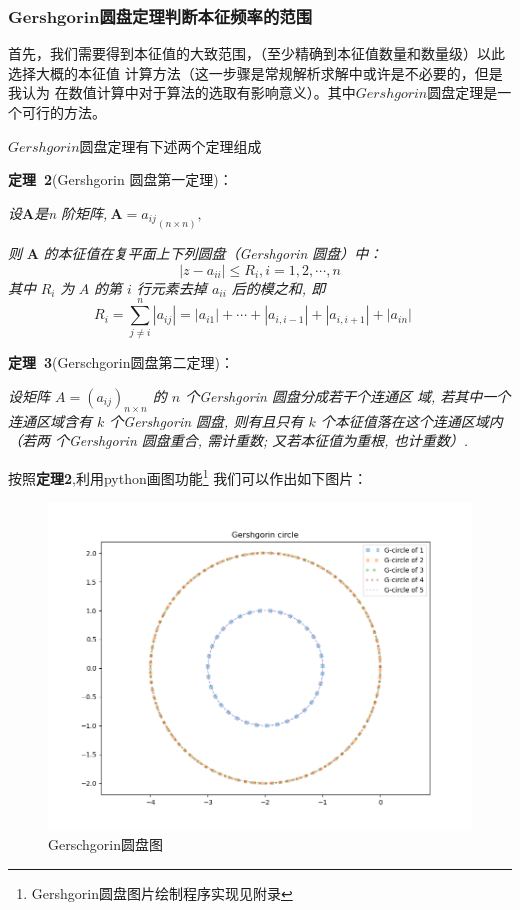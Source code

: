 \documentclass[11pt, a4paper, oneside]{ctexart}
\begin{document}
{\subsubsection{$\mathbf {Gershgorin}$圆盘定理判断本征频率的范围}
{
    首先，我们需要得到本征值的大致范围，（至少精确到本征值数量和数量级）以此选择大概的本征值
    计算方法（这一步骤是常规解析求解中或许是不必要的，但是我认为
    在数值计算中对于算法的选取有影响意义）。其中$ {Gershgorin}$圆盘定理是一个可行的方法。
    
    $ {Gershgorin}${圆盘定理}有下述两个定理组成
    \vspace{2mm}

    \textbf{定理\ 2}(Gershgorin
    圆盘第一定理)：
    
    \emph{设}$\boldsymbol {A}$\emph{是n
    阶矩阵,}$\ \boldsymbol A={a_{ij}}_{(n \times n)},\ ${\emph 则
    $\boldsymbol A$   \emph{的本征值在复平面上下列圆盘（Gershgorin 圆盘）中：
    }
    $$
    \left|z-a_{i i}\right| \leq R_{i}, i=1,2, \cdots, n
    $$
    \emph{其中} $R_{i}$ \emph 为 $A$ \emph{的第{} $i$
    行元素去掉 $a_{i i}$ 后的模之和, 即
    $$R_{i}=\sum_{j \neq i}^{n}\left|a_{i j}\right|=\left|a_{i 1}\right|+\cdots+\left|a_{i, i-1}\right|+\left|a_{i, i+1}\right|+\left|a_{i n}\right| \quad$$ 
    }
    \vspace{-6mm}

    \textbf{定理\ 3}(Gerschgorin圆盘第二定理)：
    
    \emph{设矩阵 $A=\left(a_{i j}\right)_{n \times n}$ 的 $n$ 个Gershgorin
    圆盘分成若干个连通区 域, 若其中一个连通区域含有 $k$ 个Gershgorin
    圆盘, 则有且只有 $k$ 个本征值落在这个连通区域内（若两 个Gershgorin
    圆盘重合, 需计重数; 又若本征值为重根, 也计重数）.
    }

    
    按照\textbf{定理2},利用python画图功能\footnote{Gershgorin圆盘图片绘制程序实现见附录}
    我们可以作出如下图片：
    \begin{figure}[h]
	
        \centering
        \vspace{4mm}
        \includegraphics[scale=0.55]{Gershgorin_circle.png}
        \caption{Gerschgorin圆盘图}
    \end{figure} 

}}}
\end{document}
